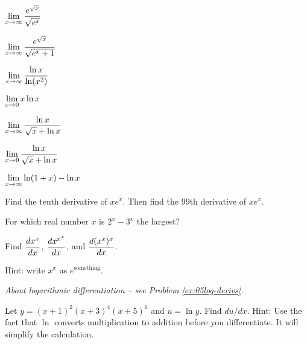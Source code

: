 \begin{multicols}{2}
\begin{multicols}{2}
\problem  $\displaystyle\lim_{x \to\infty}\frac{e^{\sqrt x}}{\sqrt{e^x}} $ %




\problem  $\displaystyle\lim_{x \to \infty} \frac{e^{\sqrt{x}}} {\sqrt{e^x+1}}$ %




\problem  $\displaystyle\lim_{x \to\infty}\frac{\ln x}{\ln (x^2)} $ %




\problem  $\displaystyle\lim_{x \to 0} x\ln x$ %




\problem  $\displaystyle\lim_{x\to\infty}\frac{\ln x}{\sqrt x+\ln x} $ %




\problem  $\displaystyle\lim_{x\to 0}\frac{\ln x}{\sqrt x+\ln x} $ %




\end{multicols}
\problem  $\displaystyle\lim_{x \to\infty}\ln (1+x) - \ln x$ %








\problem  Find the tenth derivative of $xe^x$.  Then find the $99$th %
derivative of $xe^{x}$.




\problem For which real number $x$ is $2^x- 3^x$ the largest? %








\problem Find $\displaystyle\frac{dx^x}{dx} $, $\displaystyle\frac{d x^{x^x}}{dx}$, and %
$\displaystyle\frac{d(x^x)^x}{dx} $.




\null\hfill Hint: write $x^x$ as $e^{\text{something}}$.







\problem \groupproblem \textit{About logarithmic differentiation -- %
see Problem \ref{ex:05log-derivs}.}




\subprob  Let $y=(x+1)^2(x+3)^4(x+5)^6$ and $u=\ln y$.  Find $du/dx$. Hint:
Use the fact that $\ln$ converts multiplication to addition before you
differentiate.  It will simplify the calculation.





\end{multicols}
